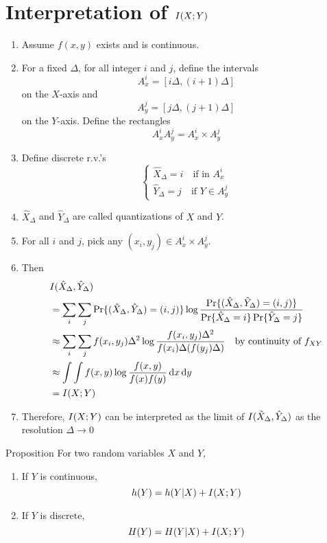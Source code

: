 \documentclass[../main.tex]{subfiles}
\begin{document}
\section{Interpretation of $I(X;Y)$}
\begin{enumerate}
    \item Assume $f(x,y)$ exists and is continuous.
    \item For a fixed $\Delta$, for all integer $i$ and $j$, define the intervals \[
    A_x^i = [i\Delta, (i+1)\Delta]
    \] on the $X$-axis and \[
    A^j_y=[j\Delta, (j+1)\Delta]
    \] on the $Y$-axis. Define the rectangles \[
        A^i_x A^j_y=A^i_x\times A^j_y
    \]
    \item Define discrete r.v.'s \[
    \begin{cases}
        \hat X_\Delta = i \quad \text{if in $A^i_x$}\\
        \hat Y_\Delta = j \quad \text{if $Y\in A^j_y$}
    \end{cases}
    \]
    \item $\hat X_\Delta$ and $\hat Y_\Delta$ are called quantizations of $X$ and $Y$.
    \item For all $i$ and $j$, pick any $(x_i, y_j)\in A^i_x \times A^j_y$.
    \item Then \begin{align*}
        &I(\hat X_\Delta,\hat Y_\Delta)\\
        &= \sum_i\sum_j \Pr\{(\hat X_\Delta, \hat Y_\Delta) = (i,j)\} \log \frac{\Pr\{(\hat X_\Delta, \hat Y_\Delta) = (i,j)\}}{\Pr\{\hat X_\Delta = i\}\Pr\{\hat Y_\Delta = j\}}\\
        &\approx \sum_i\sum_j f(x_i, y_j)\Delta^2 \log\frac{f(x_i,y_j)\Delta^2}{f(x_i)\Delta (f(y_j)\Delta)} \quad \text{by continuity of $f_{XY}$}\\
        &\approx \int \int f(x,y)\log\frac{f(x,y)}{f(x)f(y)}\,\mathrm{d} x\,\mathrm{d} y\\
        &= I(X;Y)
    \end{align*}
    \item Therefore, $I(X;Y)$ can be interpreted as the limit of $I(\hat X_\Delta, \hat Y_\Delta)$ as the resolution $\Delta\to 0$
\end{enumerate}
\begin{bbox}{Proposition}
    For two random variables $X$ and $Y$,
    \begin{enumerate}
        \item If $Y$ is continuous, \[
        h(Y) = h(Y|X)+I(X;Y)
        \]
        \item If $Y$ is discrete, \[
        H(Y) = H(Y|X) + I(X;Y)
        \]
    \end{enumerate}
\end{bbox} 
\end{document}
